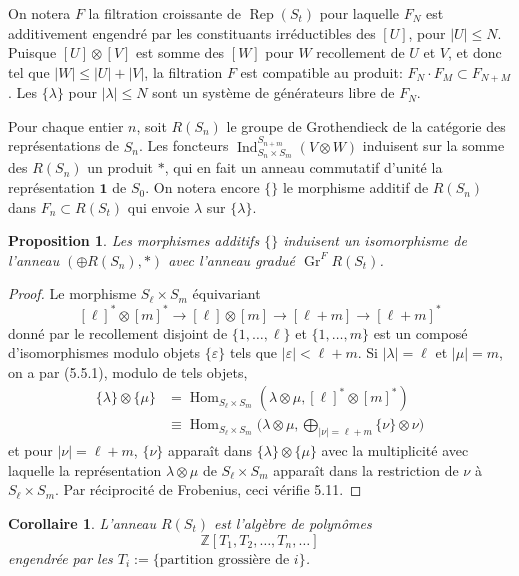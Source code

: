 \documentclass[11pt,a4paper]{article}
\theoremstyle{plain}
\newtheorem{proposition}[theorem]{Proposition}
\newtheorem{corollary}[theorem]{Corollaire}
\theoremstyle{definition}
\DeclareMathOperator{\Hom}{Hom}
\DeclareMathOperator{\Ind}{Ind}
\DeclareMathOperator{\Rep}{Rep}
\newcommand{\Z}{\mathbb{Z}}
\newcommand{\eps}{\varepsilon}
\DeclareMathOperator{\Gr}{Gr}
\begin{document}
On notera $F$ la filtration croissante de $\Rep(S_t)$ pour laquelle $F_N$ est additivement engendr\'e par les constituants irr\'eductibles des $[U]$, pour $|U| \leq N$. Puisque $[U] \otimes [V]$ est somme des $[W]$ pour $W$ recollement de $U$ et $V$, et donc tel que $|W| \leq |U| + |V|$, la filtration $F$ est compatible au produit: $F_N \cdot F_M \subset F_{N+M}$. Les $\{\lambda\}$ pour $|\lambda| \leq N$ sont un syst\`eme de g\'en\'erateurs libre de $F_N$.

Pour chaque entier $n$, soit $R(S_n)$ le groupe de Grothendieck de la cat\'egorie des repr\'esentations de $S_n$. Les foncteurs $\Ind^{S_{n+m}}_{S_n \times S_m}(V \otimes W)$ induisent sur la somme des $R(S_n)$ un produit $\ast$, qui en fait un anneau commutatif d'unit\'e la repr\'esentation $\mathbf{1}$ de $S_0$. On notera encore $\{\}$ le morphisme additif de $R(S_n)$ dans $F_n \subset R(S_t)$ qui envoie $\lambda$ sur $\{\lambda\}$.

\begin{proposition}
Les morphismes additifs $\{\}$ induisent un isomorphisme de l'anneau $(\oplus R(S_n), \ast)$ avec l'anneau gradu\'e $\Gr^F R(S_t)$.
\end{proposition}

\begin{proof}
Le morphisme $S_\ell \times S_m$ \'equivariant
\[
[\ell]^* \otimes [m]^* \to [\ell] \otimes [m] \to [\ell+m] \to [\ell+m]^*
\]
donn\'e par le recollement disjoint de $\{1, \ldots, \ell\}$ et $\{1, \ldots, m\}$ est un compos\'e d'isomorphismes modulo objets $\{\eps\}$ tels que $|\eps| < \ell+m$. Si $|\lambda| = \ell$ et $|\mu| = m$, on a par (5.5.1), modulo de tels objets,
\begin{align*}
\{\lambda\} \otimes \{\mu\} &= \Hom_{S_\ell \times S_m}(\lambda \otimes \mu, [\ell]^* \otimes [m]^*) \\
&\equiv \Hom_{S_\ell \times S_m}\bigl(\lambda \otimes \mu, \bigoplus_{|\nu| = \ell+m} \{\nu\} \otimes \nu\bigr)
\end{align*}
et pour $|\nu| = \ell+m$, $\{\nu\}$ appara\^it dans $\{\lambda\} \otimes \{\mu\}$ avec la multiplicit\'e avec laquelle la repr\'esentation $\lambda \otimes \mu$ de $S_\ell \times S_m$ appara\^it dans la restriction de $\nu$ \`a $S_\ell \times S_m$. Par r\'eciprocit\'e de Frobenius, ceci v\'erifie 5.11.
\end{proof}

\begin{corollary}
L'anneau $R(S_t)$ est l'alg\`ebre de polyn\^omes
\[
\Z[T_1, T_2, \ldots, T_n, \ldots]
\]
engendr\'ee par les $T_i := \{\text{partition grossi\`ere de } i\}$.
\end{corollary}
\end{document}
